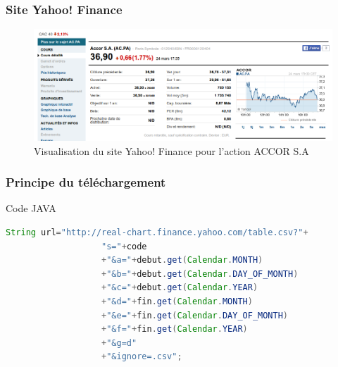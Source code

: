 \begin{frame}
    \frametitle{Site Yahoo! Finance}
    
    	   \begin{figure}[H]
      \center
      \includegraphics[scale=0.30]{images/yahoo.png}
      \caption{Visualisation du site Yahoo! Finance pour l'action ACCOR S.A}
      \end{figure}
    	   
\end{frame}

\begin{frame}[fragile]
    \frametitle{Principe du téléchargement}
    \begin{block}{Code JAVA}
  \begin{lstlisting}[language=JAVA, basicstyle=\scriptsize] 
String url="http://real-chart.finance.yahoo.com/table.csv?"+
		           "s="+code  
		           +"&a="+debut.get(Calendar.MONTH) 
		           +"&b="+debut.get(Calendar.DAY_OF_MONTH) 
		           +"&c="+debut.get(Calendar.YEAR) 
		           +"&d="+fin.get(Calendar.MONTH)
		           +"&e="+fin.get(Calendar.DAY_OF_MONTH)
		           +"&f="+fin.get(Calendar.YEAR)
		           +"&g=d" 
		           +"&ignore=.csv"; 
\end{lstlisting}	  
	\end{block}

\end{frame}
